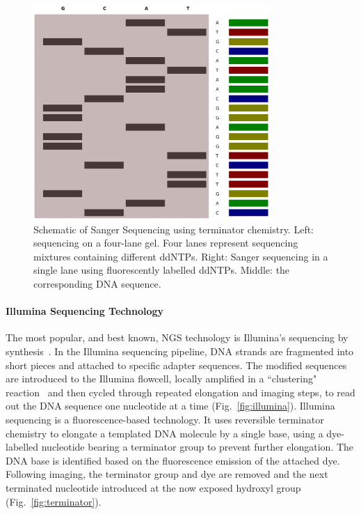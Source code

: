 \begin{figure}
\centerline{\includegraphics[width=0.8\textwidth]{illumina/sanger.pdf}}
\caption{Schematic of Sanger Sequencing using terminator chemistry. Left: sequencing on a four-lane gel. Four lanes represent sequencing mixtures containing different ddNTPs. Right: Sanger sequencing in a single lane using fluorescently labelled ddNTPs. Middle: the corresponding DNA sequence.}
\label{fig:sanger}
\end{figure} 

\paragraph{Illumina Sequencing Technology}
The most popular, and best known, NGS technology is Illumina's sequencing by synthesis~\cite{illumina2010}. In the Illumina sequencing pipeline, DNA strands are fragmented into short pieces and attached to specific adapter sequences. The modified sequences are introduced to the Illumina flowcell, locally amplified in a ``clustering" reaction~\cite{Adessi2000} and then cycled through repeated elongation and imaging steps, to read out the DNA sequence one nucleotide at a time (Fig.~\ref{fig:illumina}). Illumina sequencing is a fluorescence-based technology. It uses reversible terminator chemistry to elongate a templated DNA molecule by a single base, using a dye-labelled nucleotide bearing a terminator group to prevent further elongation. The DNA base is identified based on the fluorescence emission of the attached dye. Following imaging, the terminator group and dye are removed and the next terminated nucleotide introduced at the now exposed hydroxyl group (Fig.~\ref{fig:terminator}). 

